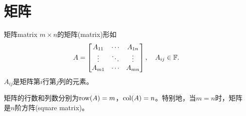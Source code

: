 
\section{矩阵}
\begin{definition}{矩阵}{matrix}
    $m\times n$的矩阵(matrix)形如
    \[
        A=\begin{bmatrix}
            A_{11}&\cdots&A_{1n}\\
            \vdots&\ddots&\vdots\\
            A_{m1}&\cdots&A_{mn}
        \end{bmatrix},\quad A_{ij}\in\mathbb F.
    \]
    $A_{ij}$是矩阵第$i$行第$j$列的元素。
    
    矩阵的行数和列数分别为$\operatorname{row}(A)=m$，$\operatorname{col}(A)=n$。特别地，当$m=n$时，矩阵是$n$阶方阵(square matrix)。
\end{definition}

